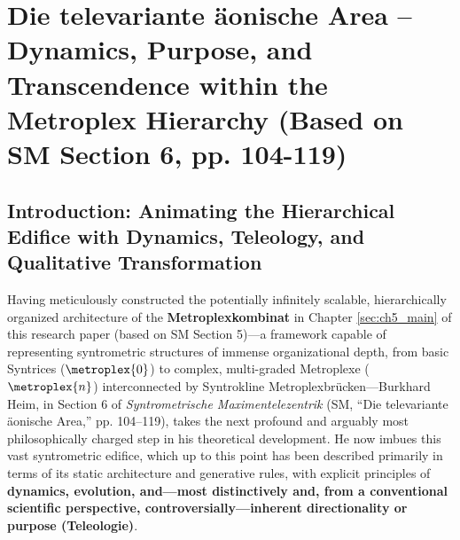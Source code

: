 \documentclass[
    12pt,              %
    a4paper,           %
    headings=normal,   %
    twoside=true,      %
    BCOR=8mm,          %
]{scrbook}
\newcommand{\q}[1]{\enquote{#1}}
\begin{document}
\clearpage

\chapter{Die televariante äonische Area – Dynamics, Purpose, and Transcendence within the Metroplex Hierarchy (Based on SM Section 6, pp. 104-119)}
\label{sec:ch6_main}

\section{Introduction: Animating the Hierarchical Edifice with Dynamics, Teleology, and Qualitative Transformation}
\label{sec:ch6_intro}

Having meticulously constructed the potentially infinitely scalable, hierarchically organized architecture of the \textbf{Metroplexkombinat} in Chapter \ref{sec:ch5_main} of this research paper (based on SM Section 5)—a framework capable of representing syntrometric structures of immense organizational depth, from basic Syntrices (\(\metroplex{0}\)) to complex, multi-graded Metroplexe (\(\metroplex{n}\)) interconnected by Syntrokline Metroplexbrücken—Burkhard Heim, in Section 6 of \textit{Syntrometrische Maximentelezentrik} (SM, \q{Die televariante äonische Area,} pp. 104–119), takes the next profound and arguably most philosophically charged step in his theoretical development. He now imbues this vast syntrometric edifice, which up to this point has been described primarily in terms of its static architecture and generative rules, with explicit principles of \textbf{dynamics, evolution, and—most distinctively and, from a conventional scientific perspective, controversially—inherent directionality or purpose (Teleologie)}.
\end{document}
